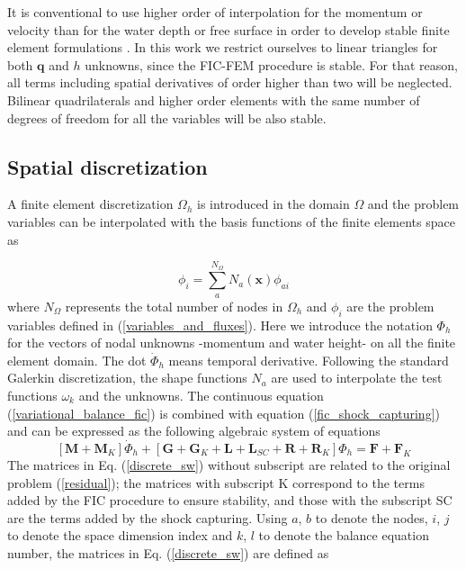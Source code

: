 \documentclass[a4paper,12pt]{article}
\begin{document}
It is conventional to use higher order of interpolation for the momentum or velocity than for the water depth or free surface in order to develop stable finite element formulations \cite{hood1974,heniche2000,bercovier1979}. In this work we restrict ourselves to linear triangles for both $\mathbf{q}$ and $h$ unknowns, since the FIC-FEM procedure is stable. For that reason, all terms including spatial derivatives of order higher than two will be neglected. Bilinear quadrilaterals and higher order elements with the same number of degrees of freedom for all the variables will be also stable.

\subsection{Spatial discretization}

A finite element discretization $\Omega_h$ is introduced in the domain $\Omega$ and the problem variables can be interpolated with the basis functions of the finite elements space as

\begin{equation}
\phi_i = \sum_a^{N_\Omega} N_a(\mathbf{x})\phi_{ai}
\end{equation}
where $N_\Omega$ represents the total number of nodes in $\Omega_h$ and $\phi_i$ are the problem variables defined in (\ref{variables_and_fluxes}). Here we introduce the notation $\Phi_h$ for the vectors of nodal unknowns -momentum and water height- on all the finite element domain. The dot $\dot\Phi_h$ means temporal derivative. Following the standard Galerkin discretization, the shape functions $N_a$ are used to interpolate the test functions $\omega_k$ and the unknowns. The continuous equation (\ref{variational_balance_fic}) is combined with equation (\ref{fic_shock_capturing}) and can be expressed as the following algebraic system of equations
\begin{equation} \label{discrete_sw}
[\mathbf{M} + \mathbf{M}_K] \dot{\Phi}_h
+ [\mathbf{G} + \mathbf{G}_K + \mathbf{L} + \mathbf{L}_{SC} + \mathbf{R} + \mathbf{R}_K] \Phi_h
= \mathbf{F} + \mathbf{F}_K
\end{equation}
The matrices in Eq. (\ref{discrete_sw}) without subscript are related to the original problem (\ref{residual}); the matrices with subscript K correspond to the terms added by the FIC procedure to ensure stability, and those with the subscript SC are the terms added by the shock capturing. Using $a$, $b$ to denote the nodes, $i$, $j$ to denote the space dimension index and $k$, $l$ to denote the balance equation number, the matrices in Eq. (\ref{discrete_sw}) are defined as
\end{document}
